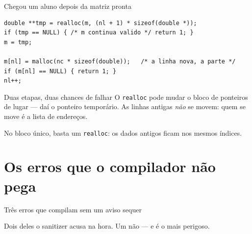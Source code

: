 \documentclass[aspectratio=169]{beamer}
\begin{document}
\begin{frame}[fragile]{Chegou um aluno depois da matriz pronta}
\begin{lstlisting}[basicstyle=\ttfamily\scriptsize, numbers=none]
double **tmp = realloc(m, (nl + 1) * sizeof(double *));
if (tmp == NULL) { /* m continua valido */ return 1; }
m = tmp;

m[nl] = malloc(nc * sizeof(double));   /* a linha nova, a parte */
if (m[nl] == NULL) { return 1; }
nl++;
\end{lstlisting}
  \begin{block}{Duas etapas, duas chances de falhar}
    O \texttt{realloc} pode mudar o bloco de ponteiros de lugar --- daí o
    ponteiro temporário. As linhas antigas \emph{não} se movem: quem se move
    é a lista de endereços.
  \end{block}
  \begin{exampleblock}{}
    \small No bloco único, basta um \texttt{realloc}: os dados antigos ficam
    nos mesmos índices.
  \end{exampleblock}
\end{frame}

\section{Os erros que o compilador não pega}

\begin{frame}{Três erros que compilam sem um aviso sequer}
  \begin{center}
  \end{center}
  \begin{block}{}
    \small Dois deles o sanitizer acusa na hora. Um não --- e é o mais
    perigoso.
  \end{block}
\end{frame}
\end{document}
